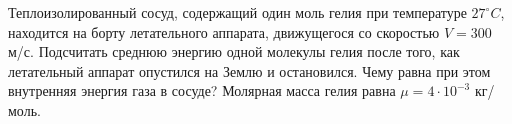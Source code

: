 
Теплоизолированный сосуд, содержащий один моль гелия при температуре $27^{\circ}C$, 
находится на борту летательного аппарата, движущегося со скоростью $V = 300$ м/с. Подсчитать 
среднюю энергию одной молекулы гелия после того, как летательный аппарат опустился на Землю и 
остановился. Чему равна при этом внутренняя энергия газа в сосуде? Молярная масса гелия равна $\mu =4 \cdot 10^{-3}$ кг/моль. 